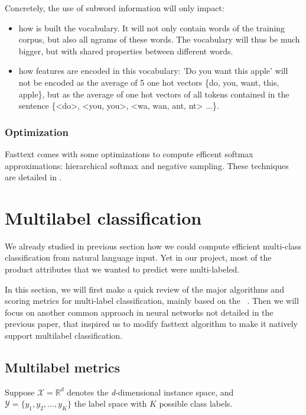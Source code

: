Concretely, the use of subword information will only impact:
\begin{itemize}
	\item how is built the vocabulary. It will not only contain words of the training corpus, but also all ngrams of these words. The vocabulary will thus be much bigger, but with shared properties between different words.
	\item how features are encoded in this vocabulary: 'Do you want this apple' will not be encoded as the average of 5 one hot vectors \{do, you, want, this, apple\}, but as the average of one hot vectors of all tokens contained in the sentence \{<do>, <you, you>, <wa, wan, ant, nt> ...\}.
\end{itemize}

\subsubsection{Optimization}

Fasttext comes with some optimizations to compute efficent softmax approximations: hierarchical softmax and negative sampling. These techniques are detailed in \cite{fasttextTricks}.

\pagebreak
\section{Multilabel classification}

We already studied in previous section how we could compute efficient multi-class classification from natural language input. Yet in our project, most of the product attributes that we wanted to predict were multi-labeled.

In this section, we will first make a quick review of the major algorithms and scoring metrics for multi-label classification, mainly based on the ~\cite[following paper]{MultilabelReview}. Then we will focus on another common approach in neural networks not detailed in the previous paper, that inspired us to modify fasttext algorithm to make it natively support multilabel classification.


\subsection{Multilabel metrics}

Suppose $\mathcal{X} = \mathbb{R}^d$ denotes the \textit{d}-dimensional instance space, and  $\mathcal{Y} = \{y_1, y_2, \dots, y_K \}$ the label space with $K$ possible class labels.

